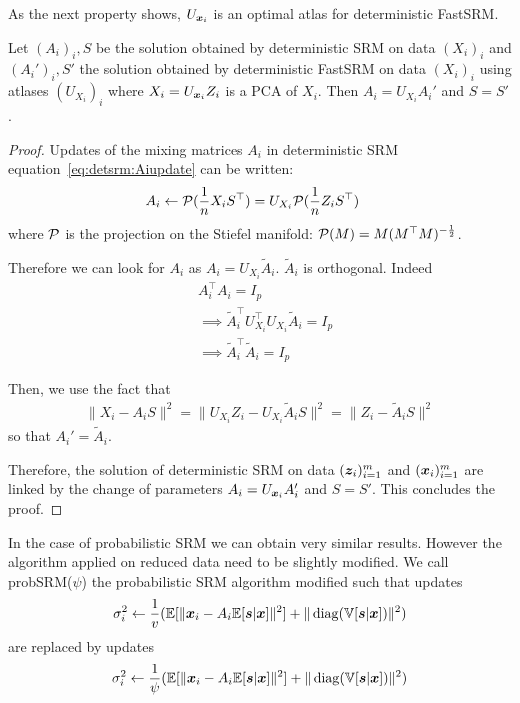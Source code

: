 As the next property shows, $U_{\boldsymbol{x}_i}$ is an optimal atlas for deterministic FastSRM.
\begin{proposition}
  Let $(A_i)_i, S$ be the solution obtained by deterministic SRM on data
  $(X_i)_i$ and $(A_i')_i, S'$ the solution obtained by deterministic FastSRM on
  data $(X_i)_i$ using atlases $(U_{X_i})_i$ where $X_i = U_{\boldsymbol{x}_i} Z_i$ is a PCA
  of $X_i$. Then $A_i = U_{X_i}A_i'$ and $S = S'$. 
\label{prop:optimaldetsrm}
\end{proposition}
\begin{proof}
Updates of the mixing matrices $A_i$ in deterministic SRM
equation~\eqref{eq:detsrm:Aiupdate} can be written:
\begin{align}
  A_i &\leftarrow \mathcal{P}(\frac1{n}X_i S^{\top})= U_{X_i}\mathcal{P}(\frac1{n}Z_i S^{\top})
  \label{eq:fastdetsrm:Aiupdate}
\end{align}
where $\mathcal{P}$ is the projection on the Stiefel manifold: $\mathcal{P}(M) = M
(M^{\top}M)^{-\frac12}$.


Therefore we can look for $A_i$ as $A_i = U_{X_i} \tilde{A}_i$. $\tilde{A}_i$ is
orthogonal. Indeed
\begin{align}
  &A_i^{\top} A_i = I_p \\
  & \implies \tilde{A}_i^{\top}U_{X_i}^{\top} U_{X_i} \tilde{A}_i = I_p \\
  & \implies \tilde{A}_i^{\top} \tilde{A}_i = I_p
\end{align}

Then, we use the fact that
\begin{align}
  \|X_i - A_i S \|^2 = \| U_{X_i}Z_i - U_{X_i}\tilde{A}_i S\|^2 = \| Z_i - \tilde{A}_i S \|^2
  \label{eq:equality:xy}
\end{align}
so that $A_i' = \tilde{A}_i$.

Therefore, the solution of deterministic SRM on data $(\boldsymbol{z}_i)_{i=1}^m$ and
$(\boldsymbol{x}_i)_{i=1}^m$ are linked by the change of parameters $A_i = U_{\boldsymbol{x}_i}A_i'$ and
$S = S'$. This concludes the proof.
\end{proof}

In the case of probabilistic SRM we can obtain very similar results. However the
algorithm applied on reduced data need to be slightly modified.
We call probSRM($\psi$) the probabilistic SRM algorithm modified such that
updates
\begin{align}
\sigma_i^2 \leftarrow \frac1{v} (\mathbb{E}[\| \boldsymbol{x}_i - A_i \mathbb{E}[\boldsymbol{s}|\boldsymbol{x}]\|^2] + \| \operatorname*{diag}(\mathbb{V}[\boldsymbol{s} | \boldsymbol{x}]) \|^2)
\end{align}
are replaced by updates
\begin{align}
  \sigma_i^2 \leftarrow \frac1{\psi} (\mathbb{E}[\| \boldsymbol{x}_i - A_i \mathbb{E}[\boldsymbol{s}|\boldsymbol{x}]\|^2] + \| \operatorname*{diag}(\mathbb{V}[\boldsymbol{s} | \boldsymbol{x}]) \|^2)
\end{align}

